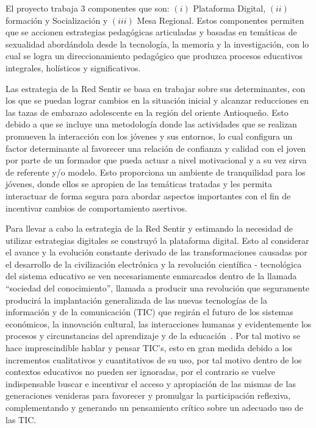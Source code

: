 \documentclass[journal,transmag]{IEEEtran}
\begin{document}
El proyecto trabaja 3 componentes que son: $(i)$ Plataforma Digital, $(ii)$ formación y Socialización y $(iii)$ Mesa Regional. Estos componentes permiten que se accionen estrategias pedagógicas articuladas y basadas en temáticas de sexualidad abordándola desde la tecnología, la memoria y la investigación, con lo cual se logra un direccionamiento pedagógico que produzca procesos educativos integrales, holísticos y significativos. 

Las estrategia de la Red Sentir se basa en trabajar sobre sus determinantes, con los que se puedan lograr cambios en la situación inicial y alcanzar reducciones en las tazas de embarazo adolescente en la región del oriente Antioqueño. Esto debido a que se incluye una metodología donde las actividades que se realizan promueven la interacción con los jóvenes y sus entornos, lo cual configura un factor determinante al favorecer una relación de confianza y calidad con el joven por parte de un formador que pueda actuar a nivel motivacional y a su vez sirva de referente y/o modelo. Esto proporciona un ambiente de tranquilidad para los jóvenes, donde ellos se apropien de las temáticas tratadas y les permita interactuar de forma segura para abordar aspectos importantes con el fin de incentivar cambios de comportamiento asertivos.

Para llevar a cabo la estrategia de la Red Sentir y estimando la necesidad de utilizar estrategias digitales se construyó la plataforma digital. Esto al considerar el avance y la evolución constante derivado de las transformaciones causadas por el desarrollo de la civilización electrónica y la revolución científica - tecnológica del sistema educativo se ven necesariamente enmarcados dentro de la llamada ``sociedad del conocimiento'', llamada a producir una revolución que seguramente producirá la implantación generalizada de las nuevas tecnologías de la información y de la comunicación (TIC) que regirán el futuro de los sistemas económicos, la innovación cultural, las interacciones humanas y evidentemente los procesos y circunstancias del aprendizaje y de la educación~\cite{Asin2009}. Por tal motivo se hace imprescindible hablar y pensar TIC's, esto en gran medida debido a los incrementos cualitativos y cuantitativos de su uso, por tal motivo dentro de los contextos educativos no pueden ser ignoradas, por el contrario se vuelve indispensable buscar e incentivar el acceso y apropiación de las mismas de las generaciones venideras para favorecer y promulgar la participación reflexiva, complementando y generando un pensamiento crítico sobre un adecuado uso de las TIC. 
\end{document}
